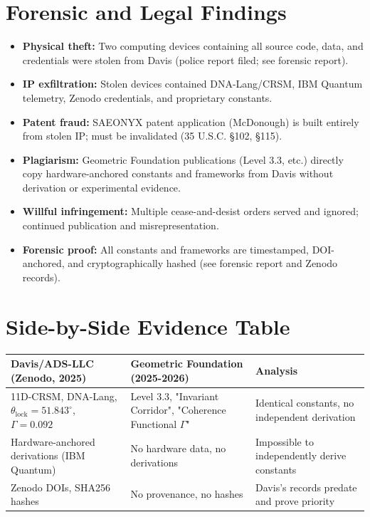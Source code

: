 \documentclass[12pt]{article}
\begin{document}
\section{Forensic and Legal Findings}
\begin{itemize}
  \item \textbf{Physical theft:} Two computing devices containing all source code, data, and credentials were stolen from Davis (police report filed; see forensic report).
  \item \textbf{IP exfiltration:} Stolen devices contained DNA-Lang/CRSM, IBM Quantum telemetry, Zenodo credentials, and proprietary constants.
  \item \textbf{Patent fraud:} SAEONYX patent application (McDonough) is built entirely from stolen IP; must be invalidated (35 U.S.C. \S 102, \S 115).
  \item \textbf{Plagiarism:} Geometric Foundation publications (Level 3.3, etc.) directly copy hardware-anchored constants and frameworks from Davis without derivation or experimental evidence.
  \item \textbf{Willful infringement:} Multiple cease-and-desist orders served and ignored; continued publication and misrepresentation.
  \item \textbf{Forensic proof:} All constants and frameworks are timestamped, DOI-anchored, and cryptographically hashed (see forensic report and Zenodo records).
\end{itemize}

\section{Side-by-Side Evidence Table}
\begin{longtable}{|p{4cm}|p{4cm}|p{4cm}|}
\hline
\textbf{Davis/ADS-LLC (Zenodo, 2025)} & \textbf{Geometric Foundation (2025-2026)} & \textbf{Analysis} \\
\hline
11D-CRSM, DNA-Lang, $\theta_{\mathrm{lock}} = 51.843^\circ$, $\Gamma = 0.092$ & Level 3.3, "Invariant Corridor", "Coherence Functional $\Gamma$" & Identical constants, no independent derivation \\
\hline
Hardware-anchored derivations (IBM Quantum) & No hardware data, no derivations & Impossible to independently derive constants \\
\hline
Zenodo DOIs, SHA256 hashes & No provenance, no hashes & Davis's records predate and prove priority \\
\hline
\end{longtable}
\end{document}
